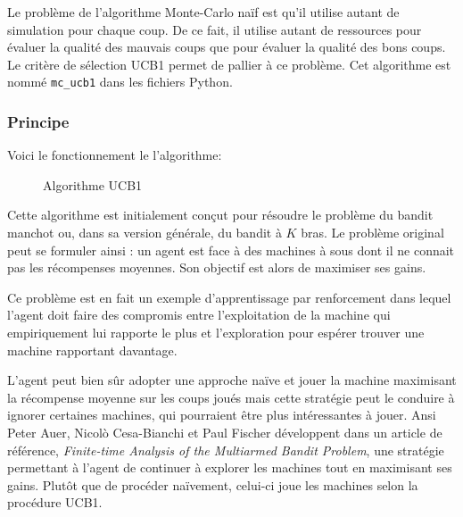 \documentclass[a4paper]{article}
\theoremstyle{definition}
\begin{document}
Le problème de l'algorithme Monte-Carlo naïf est qu'il utilise autant de simulation pour chaque coup. De ce fait, il utilise autant de ressources pour évaluer la qualité des mauvais coups que pour évaluer la qualité des bons coups. Le critère de sélection UCB1 permet de pallier à ce problème.
Cet algorithme est nommé \texttt{mc\_ucb1} dans les fichiers Python.

\subsubsection{Principe}

Voici le fonctionnement le l'algorithme: 

\begin{figure}[h]
	\noindent{}
	\caption{Algorithme UCB1}
\end{figure}

Cette algorithme est initialement conçut pour résoudre le problème du bandit manchot ou, dans sa version générale, du bandit à $K$ bras. Le problème original peut se formuler ainsi : un agent est face à des machines à sous dont il ne connait pas les récompenses moyennes. Son objectif est alors de maximiser ses gains.

Ce problème est en fait un exemple d'apprentissage par renforcement dans lequel l'agent doit faire des compromis entre l'exploitation de la machine qui empiriquement lui rapporte le plus et l'exploration pour espérer trouver une machine rapportant davantage.

L'agent peut bien sûr adopter une approche naïve et jouer la machine maximisant la récompense moyenne sur les coups joués mais  cette stratégie peut le conduire à ignorer certaines machines, qui pourraient être plus intéressantes à jouer. Ansi \\

Peter Auer, Nicol\`o Cesa-Bianchi et Paul Fischer développent dans un article de référence, \textit{Finite-time Analysis of the Multiarmed Bandit Problem}, une stratégie permettant à l'agent de continuer à explorer les machines tout en maximisant ses gains. Plutôt que de procéder naïvement, celui-ci joue les machines selon la procédure UCB1.\\
\end{document}
